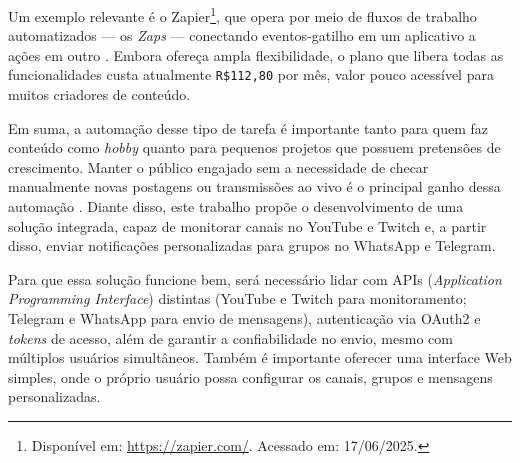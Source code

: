 Um exemplo relevante é o Zapier\footnote{Disponível em: \url{https://zapier.com/}. Acessado em: 17/06/2025.}, que opera por meio de fluxos de trabalho automatizados — os \textit{Zaps} — conectando eventos‑gatilho em um aplicativo a ações em outro \cite{rahmati2017}. Embora ofereça ampla flexibilidade, o plano que libera todas as funcionalidades custa atualmente \verb|R$112,80| por mês, valor pouco acessível para muitos criadores de conteúdo. 

Em suma, a automação desse tipo de tarefa é importante tanto para quem faz conteúdo como \textit{hobby} quanto para pequenos projetos que possuem pretensões de crescimento. Manter o público engajado sem a necessidade de checar manualmente novas postagens ou transmissões ao vivo é o principal ganho dessa automação \cite{rahmati2017}. Diante disso, este trabalho propõe o desenvolvimento de uma solução integrada, capaz de monitorar canais no YouTube e Twitch e, a partir disso, enviar notificações personalizadas para grupos no WhatsApp e Telegram.


Para que essa solução funcione bem, será necessário lidar com APIs (\textit{Application Programming Interface}) distintas (YouTube e Twitch para monitoramento; Telegram e WhatsApp para envio de mensagens), autenticação via OAuth2 e \textit{tokens} de acesso, além de garantir a confiabilidade no envio, mesmo com múltiplos usuários simultâneos. Também é importante oferecer uma interface Web simples, onde o próprio usuário possa configurar os canais, grupos e mensagens personalizadas.



